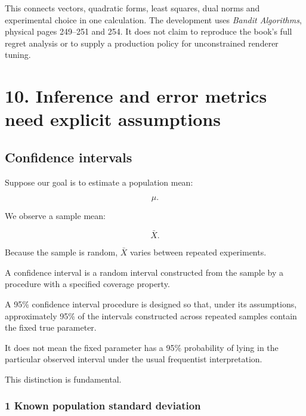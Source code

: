 This connects vectors, quadratic forms, least squares, dual norms and experimental choice in one calculation. The development uses \emph{Bandit Algorithms}, physical pages 249--251 and 254. It does not claim to reproduce the book's full regret analysis or to supply a production policy for unconstrained renderer tuning.

\section{10. Inference and error metrics need explicit assumptions}\label{02-foundations-ii-ch030-inference-and-error-metrics-need-explicit-assumptions}

\hypertarget{02-foundations-ii-ch030-inference-and-error-metrics-need-explicit-assumptions}{}

\subsection{Confidence intervals}\label{02-foundations-ii-ch030-confidence-intervals}

\hypertarget{02-foundations-ii-ch030-confidence-intervals}{}

Suppose our goal is to estimate a population mean:

\[
 \mu.
\]

We observe a sample mean:

\[
 \bar X.
\]

Because the sample is random, \(\bar X\) varies between repeated experiments.

A confidence interval is a random interval constructed from the sample by a procedure with a specified coverage property.

A 95\% confidence interval procedure is designed so that, under its assumptions, approximately 95\% of the intervals constructed across repeated samples contain the fixed true parameter.

It does not mean the fixed parameter has a 95\% probability of lying in the particular observed interval under the usual frequentist interpretation.

This distinction is fundamental.

\subsubsection{1 Known population standard deviation}\label{02-foundations-ii-ch030-known-population-standard-deviation}

